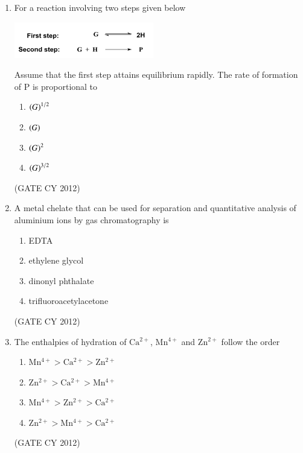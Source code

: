 \documentclass[12pt]{article}
\begin{document}
\begin{enumerate}
\item For a reaction involving two steps given below

\includegraphics[width=0.4\columnwidth]{figs/q15.png}

Assume that the first step attains equilibrium rapidly. The rate of formation of P is proportional to
\begin{multicols}{2}
\begin{enumerate}
    \item $\left(G\right)^{1/2}$
    \item $\left(G\right)$
    \item $\left(G\right)^{2}$
    \item $\left(G\right)^{3/2}$
\end{enumerate}
\end{multicols}
\hfill (GATE CY 2012)

\item A metal chelate that can be used for separation and quantitative analysis of aluminium ions by gas chromatography is
\begin{multicols}{2}
\begin{enumerate}
    \item EDTA
    \item ethylene glycol
    \item dinonyl phthalate
    \item trifluoroacetylacetone
\end{enumerate}
\end{multicols}
\hfill (GATE CY 2012)

\item The enthalpies of hydration of $\mathrm{Ca^{2+}}$, $\mathrm{Mn^{4+}}$ and $\mathrm{Zn^{2+}}$ follow the order
\begin{multicols}{2}
\begin{enumerate}
    \item $\mathrm{Mn^{4+} > Ca^{2+} > Zn^{2+}}$
    \item $\mathrm{Zn^{2+} > Ca^{2+} > Mn^{4+}}$
    \item $\mathrm{Mn^{4+} > Zn^{2+} > Ca^{2+}}$
    \item $\mathrm{Zn^{2+} > Mn^{4+} > Ca^{2+}}$
\end{enumerate}
\end{multicols}
\hfill (GATE CY 2012)



\end{enumerate}
\end{document}
